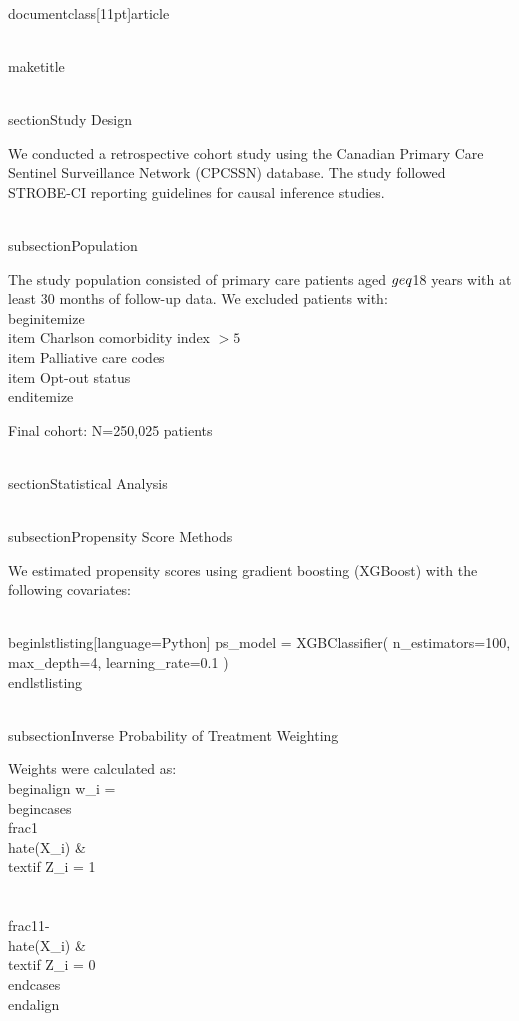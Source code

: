 \\documentclass[11pt]{article}
\begin{document}
\\maketitle

\\section{Study Design}

We conducted a retrospective cohort study using the Canadian Primary Care Sentinel Surveillance Network (CPCSSN) database. The study followed STROBE-CI reporting guidelines for causal inference studies.

\\subsection{Population}

The study population consisted of primary care patients aged $\\geq$18 years with at least 30 months of follow-up data. We excluded patients with:
\\begin{itemize}
    \\item Charlson comorbidity index $>5$
    \\item Palliative care codes
    \\item Opt-out status
\\end{itemize}

Final cohort: N=250,025 patients

\\section{Statistical Analysis}

\\subsection{Propensity Score Methods}

We estimated propensity scores using gradient boosting (XGBoost) with the following covariates:

\\begin{lstlisting}[language=Python]
ps_model = XGBClassifier(
    n_estimators=100,
    max_depth=4,
    learning_rate=0.1
)
\\end{lstlisting}

\\subsection{Inverse Probability of Treatment Weighting}

Weights were calculated as:
\\begin{align}
w_i = \\begin{cases}
    \\frac{1}{\\hat{e}(X_i)} & \\text{if } Z_i = 1 \\\\
    \\frac{1}{1-\\hat{e}(X_i)} & \\text{if } Z_i = 0
\\end{cases}
\\end{align}
\end{document}
